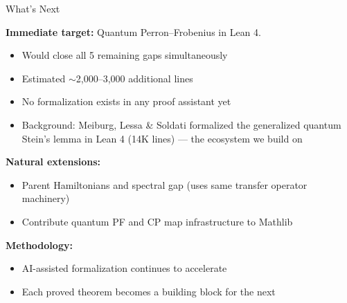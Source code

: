 \documentclass[aspectratio=169,10pt]{beamer}
\begin{document}
\begin{frame}{What's Next}
    \vspace{-0.3em}

    \textbf{Immediate target:} Quantum Perron--Frobenius in Lean 4.
    \begin{itemize}\itemsep0.1em\small
        \item Would close all 5 remaining gaps simultaneously
        \item Estimated $\sim$2,000--3,000 additional lines
        \item No formalization exists in any proof assistant yet
        \item Background: Meiburg, Lessa \& Soldati \cite{Meiburg2025Formalization} formalized the generalized quantum Stein's lemma in Lean 4 (14K lines) --- the ecosystem we build on
    \end{itemize}

    \vspace{0.3em}
    \textbf{Natural extensions:}
    \begin{itemize}\itemsep0.1em\small
        \item Parent Hamiltonians and spectral gap (uses same transfer operator machinery)
        \item Contribute quantum PF and CP map infrastructure to Mathlib
    \end{itemize}

    \vspace{0.3em}
    \textbf{Methodology:}
    \begin{itemize}\itemsep0.1em\small
        \item AI-assisted formalization continues to accelerate
        \item Each proved theorem becomes a building block for the next
    \end{itemize}
\end{frame}
\end{document}
